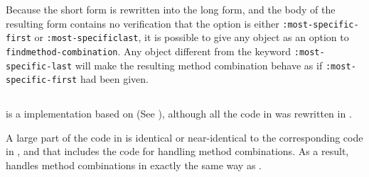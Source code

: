 Because the short form is rewritten into the long form, and the body
of the resulting form contains no verification that the option is
either \texttt{:most-specific-first} or \texttt{:most-specific\-last},
it is possible to give any object as an option to
\texttt{find\-method-combination}.  Any object different from the
keyword \texttt{:most-specific-last} will make the resulting method
combination behave as if \texttt{:most-specific-first} had been given.

\subsection{\clasp{}}

\clasp{} is a \commonlisp{} implementation based on \ecl{} (See
), although all the \clanguage{} code in \ecl{} was
rewritten in \cplusplus{}.

A large part of the \commonlisp{} code in \clasp{} is identical or
near-identical to the corresponding code in \ecl{}, and that includes
the code for handling method combinations.  As a result, \clasp{}
handles method combinations in exactly the same way as \ecl{}.
